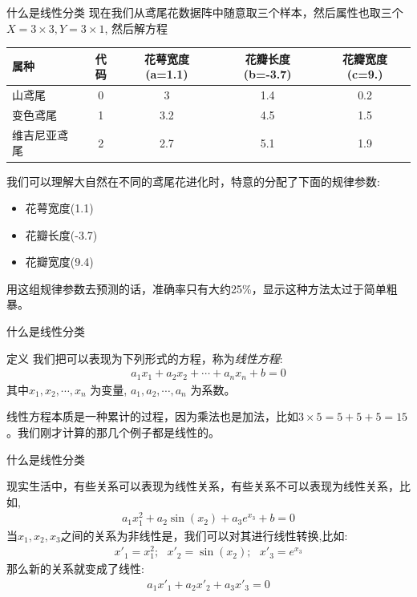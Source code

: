\documentclass[handout]{ctexbeamer}
\begin{document}
\begin{frame}{什么是线性分类}
现在我们从鸢尾花数据阵中随意取三个样本，然后属性也取三个$X= 3 \times 3, Y = 3 \times 1$, 然后解方程
\begin{table}[H]
		\centering
{\footnotesize
		\begin{tabular}{lcccc}
		\hline 
			属种 & 代码 & 花萼宽度(a=1.1) &花瓣长度(b=-3.7) & 花瓣宽度(c=9.) \\
			\hline 
			山鸢尾 & 0 & 3 &  1.4 & 0.2 \\
			变色鸢尾 & 1 & 3.2 & 4.5  & 1.5 \\
			维吉尼亚鸢尾 & 2 & 2.7 &  5.1 & 1.9  \\
			\hline  
		\end{tabular}
}
\end{table}
我们可以理解大自然在不同的鸢尾花进化时，特意的分配了下面的规律参数:
		\begin{itemize}
			\item 花萼宽度(1.1)
			\item 花瓣长度(-3.7)
			\item 花瓣宽度(9.4)
		\end{itemize}
		用这组规律参数去预测的话，准确率只有大约25\%，显示这种方法太过于简单粗暴。
\end{frame}

\begin{frame}{什么是线性分类}
	\begin{block}{定义}
	我们把可以表现为下列形式的方程，称为\textit{线性方程}:
	\begin{align*}
		a_1 x_1 + a_2 x_2 + \cdots + a_n x_n + b = 0
	\end{align*}
	其中$x_1, x_2, \cdots, x_n$ 为变量, $a_1, a_2, \cdots, a_n$ 为系数。
\end{block}
线性方程本质是一种累计的过程，因为乘法也是加法，比如$3 \times 5 = 5 + 5 + 5 = 15$。我们刚才计算的那几个例子都是线性的。
\end{frame}

\begin{frame}{什么是线性分类}
	\begin{example}
现实生活中，有些关系可以表现为线性关系，有些关系不可以表现为线性关系，比如,
\begin{align*}
	a_1 x_1^2 + a_2 \sin (x_2) + a_3 e^{x_3} + b  = 0 
\end{align*}	
当$x_1, x_2, x_3$之间的关系为非线性是，我们可以对其进行线性转换,比如:
\begin{align*}
	x'_1 = x_1^2; \ \ \ x'_2 = \sin (x_2); \ \ \ x'_3 = e^{x_3}
\end{align*}
那么新的关系就变成了线性: 
\begin{align*}
	a_1 x'_1 + a_2 x'_2 + a_3 x'_3 = 0 
\end{align*}
\end{example}
\end{frame}
\end{document}

